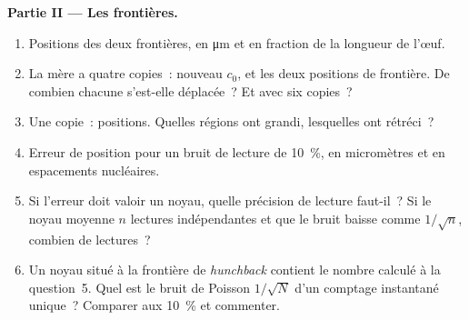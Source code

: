 \begin{problem}
\medskip
\noindent\textbf{Partie II --- Les frontières.}
\begin{enumerate}[resume]
  \item Positions des deux frontières, en \unit{\micro m} et en fraction
        de la longueur de l'œuf.
  \item La mère a quatre copies~: nouveau $c_{0}$, et les deux positions
        de frontière. De combien chacune s'est-elle déplacée~? Et avec
        six copies~?
  \item Une copie~: positions. Quelles régions ont grandi, lesquelles
        ont rétréci~?
  \item Erreur de position pour un bruit de lecture de \qty{10}{\%}, en
        micromètres et en espacements nucléaires.
  \item Si l'erreur doit valoir un noyau, quelle précision de lecture
        faut-il~? Si le noyau moyenne $n$ lectures indépendantes et que
        le bruit baisse comme $1/\sqrt{n}$, combien de lectures~?
  \item Un noyau situé à la frontière de \emph{hunchback} contient le
        nombre calculé à la question~5. Quel est le bruit de Poisson
        $1/\sqrt{N}$ d'un comptage instantané unique~? Comparer aux
        \qty{10}{\%} et commenter.
\end{enumerate}


\end{problem}
